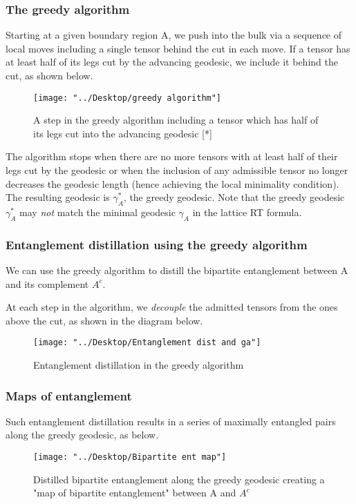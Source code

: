 \documentclass[11pt]{beamer}
\newcommand{\vs}{\vskip10pt}
\begin{document}
\begin{frame}
	
	\frametitle{The greedy algorithm}
	
	Starting at a given boundary region A, we push into the bulk via a sequence of local moves including a single tensor behind the cut in each move. If a tensor has at least half of its legs cut by the advancing geodesic, we include it behind the cut, as shown below.
	\vs
	\begin{figure}
		\centering
		\texttt{[image: "../Desktop/greedy algorithm"]}
		\caption{A step in the greedy algorithm including a tensor which has half of its legs cut into the advancing geodesic [*]}
		\label{fig:greedy-algorithm}
	\end{figure}
	The algorithm stops when there are no more tensors with at least half of their legs cut by the geodesic or when the inclusion of any admissible tensor no longer decreases the geodesic length (hence achieving the local minimality condition). The resulting geodesic is $ \gamma_A^* $, the greedy geodesic. Note that the greedy geodesic $ \gamma_A^* $ may \textit{not} match the minimal geodesic $ \gamma_A $ in the lattice RT formula.

\end{frame}


\begin{frame}
	
	\frametitle{Entanglement distillation using the greedy algorithm}
	
	We can use the greedy algorithm to distill the bipartite entanglement between A and its complement $ A^c $. 
	
	At each step in the algorithm, we \textit{decouple} the admitted tensors from the ones above the cut, as shown in the diagram below.
	
	 \begin{figure}
	 	\centering
	 	\texttt{[image: "../Desktop/Entanglement dist and ga"]}
	 	\caption{Entanglement distillation in the greedy algorithm}
	 	\label{fig:entanglement-dist-and-ga}
	 \end{figure}

\end{frame}

\begin{frame}
	
	\frametitle{Maps of entanglement}
	
	Such entanglement distillation results in a series of maximally entangled pairs along the greedy geodesic, as below.
	
	\begin{figure}
		\centering
		\texttt{[image: "../Desktop/Bipartite ent map"]}
		\caption{Distilled bipartite entanglement along the greedy geodesic creating a "map of bipartite entanglement" between A and $A^c$}
		\label{fig:bipartite-ent-map}
	\end{figure}
	
\end{frame}
\end{document}
